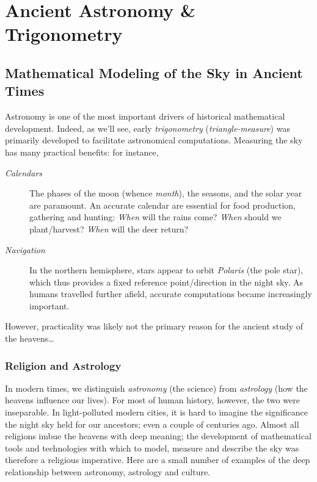 \graphicspath{{4astro/asy/}}

\section{Ancient Astronomy \& Trigonometry}


\subsection{Mathematical Modeling of the Sky in Ancient Times}\label{ssec:astro1}

Astronomy is one of the most important drivers of historical mathematical development. Indeed, as we'll see, early \emph{trigonometry} (\emph{triangle-measure}) was primarily developed to facilitate astronomical computations. Measuring the sky has many practical benefits: for instance,
\begin{description}
	\item[\normalfont\emph{Calendars}] The phases of the moon (whence \emph{month}), the seasons, and the solar year are paramount. An accurate calendar are essential for food production, gathering and hunting: \emph{When} will the rains come? \emph{When} should we plant/harvest? \emph{When} will the deer return? 
	\item[\normalfont\emph{Navigation}] In the northern hemisphere, stars appear to orbit \emph{Polaris} (the pole star), which thus provides a fixed reference point/direction in the night sky. As humans travelled further afield, accurate computations became increasingly important.
\end{description}
However, practicality was likely not the primary reason for the ancient study of the heavens\ldots

\subsubsection*{Religion and Astrology}

In modern times, we distinguish \emph{astronomy} (the science) from \emph{astrology} (how the heavens influence our lives). For most of human history, however, the two were inseparable. In light-polluted modern cities, it is hard to imagine the significance the night sky held for our ancestors; even a couple of centuries ago. Almost all religions imbue the heavens with deep meaning; the development of mathematical tools and technologies with which to model, measure and describe the sky was therefore a religious imperative. Here are a small number of examples of the deep relationship between astronomy, astrology and culture.

